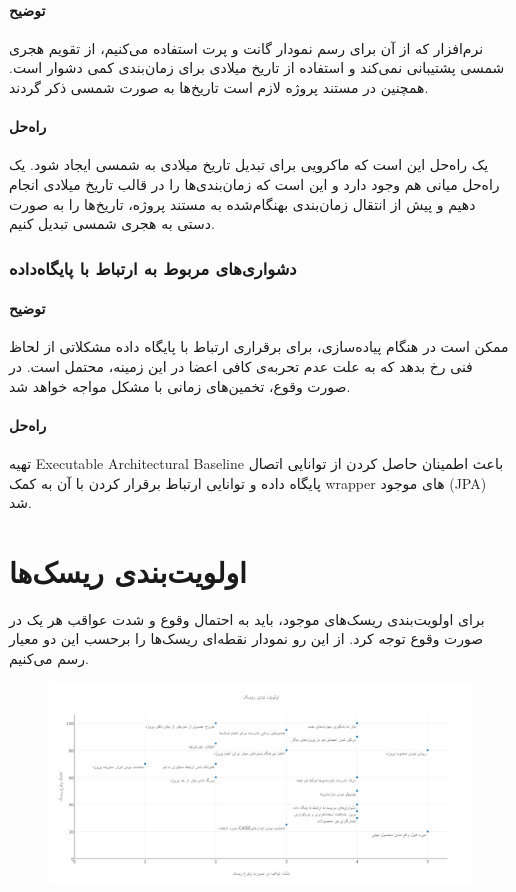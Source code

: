 \paragraph{توضیح}
نرم‌افزار 
که از آن برای رسم نمودار گانت
و پرت
استفاده می‌کنیم، از تقویم هجری شمسی پشتیبانی نمی‌کند و استفاده از تاریخ میلادی برای زمان‌بندی کمی دشوار است. همچنین در مستند پروژه لازم است تاریخ‌ها به صورت شمسی ذکر گردند.
\paragraph{راه‌حل}
یک راه‌حل این است که ماکرویی برای تبدیل تاریخ میلادی به شمسی ایجاد شود. یک راه‌حل  میانی هم وجود دارد و این است که زمان‌بندی‌ها را در قالب تاریخ میلادی انجام دهیم و پیش از انتقال زمان‌بندی بهنگام‌شده به مستند پروژه، تاریخ‌ها را به صورت دستی به هجری شمسی تبدیل کنیم.
\subsubsection{دشواری‌های مربوط به ارتباط با پایگاه‌داده}
\paragraph{توضیح}
ممکن است در هنگام پیاده‌سازی، برای برقراری ارتباط با پایگاه داده مشکلاتی از لحاظ فنی رخ بدهد که به علت عدم تحربه‌ی کافی اعضا در این زمینه، محتمل است. در صورت وقوع، تخمین‌های زمانی با مشکل مواجه خواهد شد.
\paragraph{راه‌حل}
تهیه Executable Architectural Baseline باعث اطمینان حاصل کردن از توانایی اتصال پایگاه داده و توانایی ارتباط برقرار کردن با آن به کمک wrapper های موجود (JPA) شد.

\section{اولویت‌بندی ریسک‌ها}
برای اولویت‌بندی ریسک‌های موجود، باید به احتمال وقوع و شدت عواقب هر یک در صورت وقوع توجه کرد. از این رو نمودار نقطه‌ای ریسک‌ها را برحسب این دو معیار رسم می‌کنیم.\\

\begin{figure}[H]
	\centering
	\includegraphics[scale=0.3]{img/risk_prioritization}
\end{figure}

